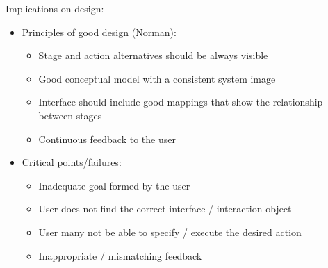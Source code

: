 Implications on design:
\begin{itemize}
\item Principles of good design (Norman):
\begin{itemize}
\item Stage and action alternatives should be always visible
\item Good conceptual model with a consistent system image
\item Interface should include good mappings that show the relationship between stages
\item Continuous feedback to the user
\end{itemize}
\item Critical points/failures:
\begin{itemize}
\item Inadequate goal formed by the user
\item User does not find the correct interface / interaction object
\item User many not be able to specify / execute the desired action
\item Inappropriate / mismatching feedback
\end{itemize}
\end{itemize}

